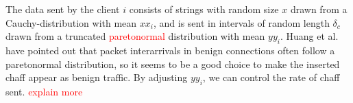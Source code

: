 \documentclass[conference]{IEEEtran}\usepackage[]{graphicx}\usepackage[]{color}
\begin{document}
The data sent by the client $i$ consists of strings with random size $x$ drawn from a Cauchy-distribution with mean $xx_i$, and is sent in intervals of random length $\delta_c$ drawn from a truncated \textcolor{red}{paretonormal} distribution with mean $yy_i$. Huang et al. \cite{huang2011detecting} have pointed out that packet interarrivals in benign connections often follow a paretonormal distribution, so it seems to be a good choice to make the inserted chaff appear as benign traffic. By adjusting $yy_i$, we can control the rate of chaff sent. \textcolor{red}{explain more}



 






\end{document}
